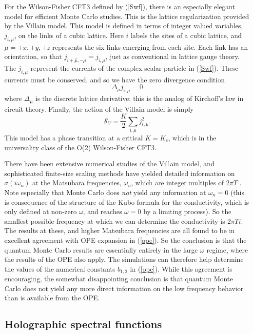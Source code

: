 \documentclass[10pt, oneside]{book}
\def\be{\begin{equation}}
\def\ee{\end{equation}}
\begin{document}
\begin{doublespace}
For the Wilson-Fisher CFT3 defined by (\ref{Swf}), there is an especially elegant model for efficient Monte Carlo studies. This is the lattice 
regularization provided by the Villain model. This model is defined in terms of integer valued variables, $j_{i,\mu}$, on the links of a cubic lattice.
Here $i$ labels the sites of a cubic lattice, and $\mu = \pm x, \pm y, \pm z$ represents the six links emerging from each site.
Each link has an orientation, so that $j_{i+\hat{\mu}, -\mu} = j_{i,\mu}$, just as conventional in lattice gauge theory. The $j_{i, \mu}$ represent
the currents of the complex scalar particle in (\ref{Swf}). These currents must be conserved, and so we have the zero divergence condition
\be
\Delta_\mu j_{i, \mu} = 0
\ee
where $\Delta_\mu$ is the discrete lattice derivative; this is the analog of Kirchoff's law in circuit theory.
Finally, the action of the Villain model is simply \cite{villain}
\be
\mathcal{S}_V = \frac{K}{2} \sum_{i , \mu} j_{i,\mu}^2 .
\ee
This model has a phase transition at a critical $K=K_c$, which is in the universality class of the O(2) Wilson-Fisher CFT3.

There have been extensive numerical studies of the Villain model, and sophisticated finite-size scaling methods have yielded detailed
information on $\sigma (i\omega_n)$ at the Matsubara frequencies, $\omega_n$, which are integer multiples of $2 \pi T$ \cite{smakov,krempa_nature,pollet,gazit13,gazit14,Katz14}. Note especially
that Monte Carlo does {\em not\/} yield any information at $\omega_n = 0$ (this is consequence of the structure of the Kubo formula for the 
conductivity, which is only defined at non-zero $\omega$, and reaches $\omega=0$ by a limiting process). So the smallest possible frequency at which we can determine
the conductivity is $2 \pi T i$. The results at these, and higher Matsubara frequencies are all found \cite{Katz14} 
to be in excellent agreement with OPE
expansion in (\ref{ope}). So the conclusion is that the quantum Monte Carlo results are essentially entirely in the large $\omega$
regime, where the results of the OPE also apply. The simulations can therefore help determine the values of the numerical constants
$b_{1,2}$ in (\ref{ope}). While this agreement is encouraging, the somewhat disappointing conclusion is that quantum Monte Carlo
does not yield any more direct information on the low frequency behavior than is available from the OPE.


\subsection{Holographic spectral functions}


\end{doublespace}
\end{document}
